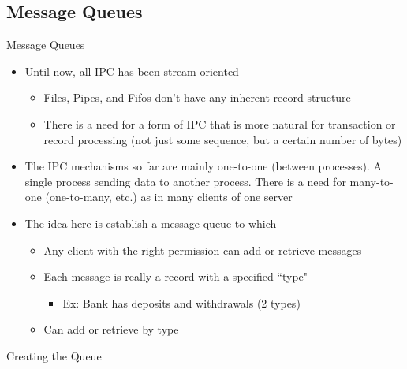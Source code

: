 \subsection{Message Queues}
Message Queues
\begin{itemize}
    \item Until now, all IPC has been stream oriented
    \begin{itemize}
        \item Files, Pipes, and Fifos don't have any inherent record structure
        \item There is a need for a form of IPC that is more natural for transaction or record processing (not just some sequence, but a certain number of bytes)
    \end{itemize}
    \item The IPC mechanisms so far are mainly one-to-one (between processes). A single process sending data to another process. There is a need for many-to-one (one-to-many, etc.) as in many clients of one server
    \item The idea here is establish a message queue to which
    \begin{itemize}
        \item Any client with the right permission can add or retrieve messages
        \item Each message is really a record with a specified ``type"
        \begin{itemize}
            \item Ex: Bank has deposits and withdrawals (2 types)
        \end{itemize}
        \item Can add or retrieve by type
    \end{itemize}
\end{itemize}
Creating the Queue
